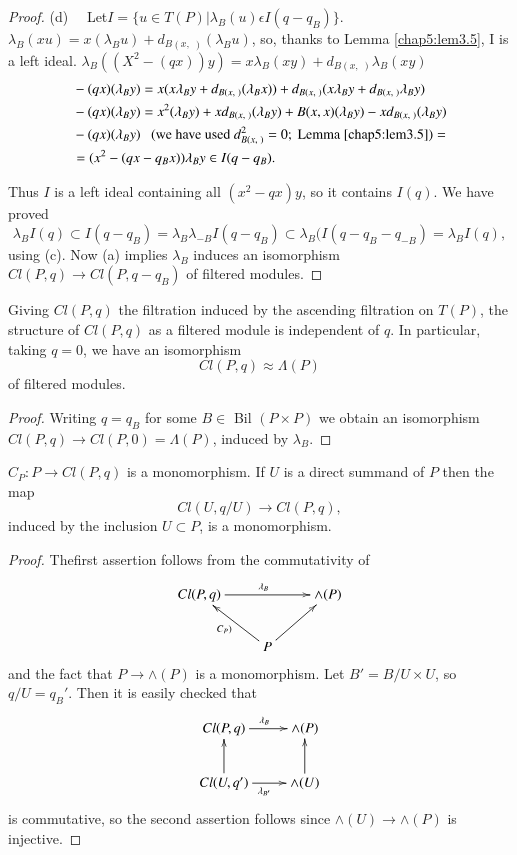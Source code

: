 \begin{proof}
(d)~~ Let\pageoriginale $I = \{ u \in T(P) | \lambda_B (u) \epsilon I
(q- q_B) \}$. $\lambda_B (xu) = x (\lambda_B u) + d_{B(x, \; )}
(\lambda_B u)$, so, thanks to Lemma \ref{chap5:lem3.5}, I is a left
ideal. $\lambda_B ((X^2 - (qx))y) = x\lambda_B (xy) + d_{B(x, \; )}
\lambda_B (x y)$  
\begin{align*}
& - (qx) (\lambda_B y ) = x(x \lambda_B y + d_{B(x, \; )} (\lambda_B x))
  + d_{B(x, \; )} (x \lambda_B y + d_{B(x, \; )} \lambda_B y)\\
& - (qx) (\lambda_B y) = x^2 (\lambda_B y) + x d_{B(x, \; )} (\lambda_B
  y) + B(x, x) (\lambda_B y) - xd_{B(x, \; )} (\lambda_B y)\\ 
& - (qx) (\lambda_B y) ~~~ (\text{we have used } d^2_{B(x, \; )} =0;
  \text{ Lemma \ref{chap5:lem3.5}}) =\\
& = (x^2 - (qx - q_B x)) \lambda_B y \in I (q - q_B). 
\end{align*}

Thus $I$ is a left ideal containing all $(x^2 - qx)y$, so it contains
$I(q)$. We have proved  
$$
\lambda_B I(q) \subset I(q - q_B) = \lambda_B \lambda_{-B} I(q - q_B)  
\subset \lambda_B (I(q - q_B - q_{-B}) = \lambda_B I(q), 
$$
using (c). Now (a) implies $\lambda_B$ induces an isomorphism $Cl(P,
q) \to Cl(P, q- q_B)$ of filtered modules. 
\end{proof}

\setcounter{coro}{6}
\begin{coro}\label{chap5:coro3.7}%
Giving $Cl (P,q)$ the filtration induced by the ascending filtration on
$T(P)$, the structure of $Cl (P, q)$ as a filtered module is
independent of $q$. In particular, taking $q = 0$, we have an
isomorphism 
$$
Cl(P, q) \approx \Lambda (P)
$$
of filtered modules.
\end{coro}

\begin{proof}%
Writing $q = q_B$ for some $B \in $ Bil $(P \times P)$ we obtain an
isomorphism $Cl(P, q) \to Cl (P, 0) = \Lambda (P)$, induced by
$\lambda_B$. 
\end{proof}

\begin{coro}%
$C_P: P \to Cl (P, q)$ is a monomorphism. If $U$ is a direct summand
  of $P$ then the map  
$$
Cl (U, q/ U) \to Cl (P, q), 
$$
induced by the inclusion $U \subset P$, is a monomorphism.
\end{coro}

\begin{proof}%
The\pageoriginale first assertion follows from the commutativity of  
\[
\xymatrix{
Cl (P,q) \ar[rr]^{\lambda_B} & & \wedge (P) \\
& P\ar[ur] \ar[ul]^{C_P)} &
}
\]
and the fact that $P \to \wedge (P)$ is a monomorphism. Let $B' = B/ U
\times U$, so $q / U = q_B'$. Then it is easily checked that  
\[
\xymatrix{
Cl (P, q) \ar[r]^{\lambda_B} & \wedge (P) \\
Cl (U, q') \ar[u] \ar[r]_{\lambda_{B'}} & \wedge (U) \ar[u]
}
\]
is commutative, so the second assertion follows since $\wedge (U) \to 
\wedge (P)$ is injective. 
\end{proof}

